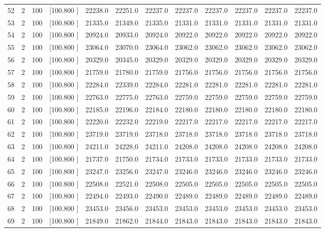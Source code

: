 \documentclass[12pt,a4paper]{article}
\begin{document}
\begin{center}
{\begin{tabular}{r r r r r r r r r r r r}
  52&  2&100&[100.800   ]& 22238.0& 22251.0& 22237.0& 22237.0& 22237.0& 22237.0& 22237.0& 22237.0\\[-0.02in]
  53&  2&100&[100.800   ]& 21335.0& 21349.0& 21335.0& 21331.0& 21331.0& 21331.0& 21331.0& 21331.0\\[-0.02in]
  54&  2&100&[100.800   ]& 20924.0& 20933.0& 20924.0& 20922.0& 20922.0& 20922.0& 20922.0& 20922.0\\[-0.02in]
  55&  2&100&[100.800   ]& 23064.0& 23070.0& 23064.0& 23062.0& 23062.0& 23062.0& 23062.0& 23062.0\\[-0.02in]
  56&  2&100&[100.800   ]& 20329.0& 20345.0& 20329.0& 20329.0& 20329.0& 20329.0& 20329.0& 20329.0\\[-0.02in]
  57&  2&100&[100.800   ]& 21759.0& 21780.0& 21759.0& 21756.0& 21756.0& 21756.0& 21756.0& 21756.0\\[-0.02in]
  58&  2&100&[100.800   ]& 22284.0& 22339.0& 22284.0& 22281.0& 22281.0& 22281.0& 22281.0& 22281.0\\[-0.02in]
  59&  2&100&[100.800   ]& 22763.0& 22775.0& 22763.0& 22759.0& 22759.0& 22759.0& 22759.0& 22759.0\\[-0.02in]
  60&  2&100&[100.800   ]& 22185.0& 22196.0& 22184.0& 22180.0& 22180.0& 22180.0& 22180.0& 22180.0\\[-0.02in]
  61&  2&100&[100.800   ]& 22220.0& 22232.0& 22219.0& 22217.0& 22217.0& 22217.0& 22217.0& 22217.0\\[-0.02in]
  62&  2&100&[100.800   ]& 23719.0& 23719.0& 23718.0& 23718.0& 23718.0& 23718.0& 23718.0& 23718.0\\[-0.02in]
  63&  2&100&[100.800   ]& 24211.0& 24228.0& 24211.0& 24208.0& 24208.0& 24208.0& 24208.0& 24208.0\\[-0.02in]
  64&  2&100&[100.800   ]& 21737.0& 21750.0& 21734.0& 21733.0& 21733.0& 21733.0& 21733.0& 21733.0\\[-0.02in]
  65&  2&100&[100.800   ]& 23247.0& 23256.0& 23247.0& 23246.0& 23246.0& 23246.0& 23246.0& 23246.0\\[-0.02in]
  66&  2&100&[100.800   ]& 22508.0& 22521.0& 22508.0& 22505.0& 22505.0& 22505.0& 22505.0& 22505.0\\[-0.02in]
  67&  2&100&[100.800   ]& 22494.0& 22493.0& 22490.0& 22489.0& 22489.0& 22489.0& 22489.0& 22489.0\\[-0.02in]
  68&  2&100&[100.800   ]& 23453.0& 23456.0& 23453.0& 23453.0& 23453.0& 23453.0& 23453.0& 23453.0\\[-0.02in]
  69&  2&100&[100.800   ]& 21849.0& 21862.0& 21844.0& 21843.0& 21843.0& 21843.0& 21843.0& 21843.0\\[-0.02in]

\end{tabular}}
\end{center}
\end{document}

